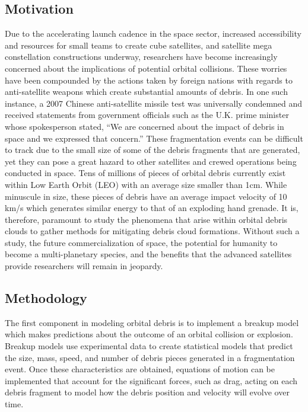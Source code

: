 \documentclass[a4paper, 12pt]{article}
\begin{document}
\subsection{Motivation}
Due to the accelerating launch cadence in the space sector, increased accessibility and resources for small teams to create cube satellites, and satellite mega constellation constructions underway, researchers have become increasingly concerned about the implications of potential orbital collisions. These worries have been compounded by the actions taken by foreign nations with regards to anti-satellite weapons which create substantial amounts of debris. In one such instance, a 2007 Chinese anti-satellite missile test was universally condemned and received statements from government officials such as the U.K. prime minister whose spokesperson stated, ``We are concerned about the impact of debris in space and we expressed that concern.'' These fragmentation events can be difficult to track due to the small size of some of the debris fragments that are generated, yet they can pose a great hazard to other satellites and crewed operations being conducted in space. Tens of millions of pieces of orbital debris currently exist within Low Earth Orbit (LEO) with an average size smaller than 1cm. While minuscule in size, these pieces of debris have an average impact velocity of 10 km/s which generates similar energy to that of an exploding hand grenade. It is, therefore, paramount to study the phenomena that arise within orbital debris clouds to gather methods for mitigating debris cloud formations. Without such a study, the future commercialization of space, the potential for humanity to become a multi-planetary species, and the benefits that the advanced satellites provide researchers will remain in jeopardy.%
\subsection{Methodology}
The first component in modeling orbital debris is to implement a breakup model which makes predictions about the outcome of an orbital collision or explosion. Breakup models use experimental data to create statistical models that predict the size, mass, speed, and number of debris pieces generated in a fragmentation event. Once these characteristics are obtained, equations of motion can be implemented that account for the significant forces, such as drag, acting on each debris fragment to model how the debris position and velocity will evolve over time. 
\end{document}
